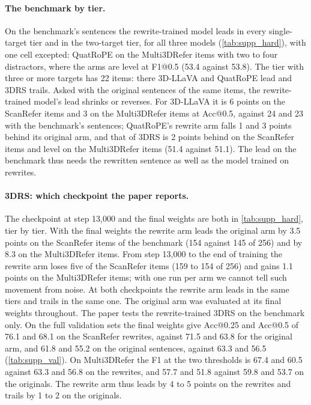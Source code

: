 \paragraph{The benchmark by tier.}
On the benchmark's sentences the rewrite-trained model leads in every single-target tier and in the two-target tier, for all three models (\cref{tab:supp_hard}), with one cell excepted: QuatRoPE on the Multi3DRefer items with two to four distractors, where the arms are level at F1@0.5 (53.4 against 53.8).
The tier with three or more targets has 22 items: there 3D-LLaVA and QuatRoPE lead and 3DRS trails.
Asked with the original sentences of the same items, the rewrite-trained model's lead shrinks or reverses.
For 3D-LLaVA it is 6 points on the ScanRefer items and 3 on the Multi3DRefer items at Acc@0.5, against 24 and 23 with the benchmark's sentences; QuatRoPE's rewrite arm falls 1 and 3 points behind its original arm, and that of 3DRS is 2 points behind on the ScanRefer items and level on the Multi3DRefer items (51.4 against 51.1).
The lead on the benchmark thus needs the rewritten sentence as well as the model trained on rewrites.

\paragraph{3DRS: which checkpoint the paper reports.}
The checkpoint at step 13,000 and the final weights are both in \cref{tab:supp_hard}, tier by tier.
With the final weights the rewrite arm leads the original arm by 3.5 points on the ScanRefer items of the benchmark (154 against 145 of 256) and by 8.3 on the Multi3DRefer items.
From step 13,000 to the end of training the rewrite arm loses five of the ScanRefer items (159 to 154 of 256) and gains 1.1 points on the Multi3DRefer items; with one run per arm we cannot tell such movement from noise.
At both checkpoints the rewrite arm leads in the same tiers and trails in the same one.
The original arm was evaluated at its final weights throughout.
The paper tests the rewrite-trained 3DRS on the benchmark only.
On the full validation sets the final weights give Acc@0.25 and Acc@0.5 of 76.1 and 68.1 on the ScanRefer rewrites, against 71.5 and 63.8 for the original arm, and 61.8 and 55.2 on the original sentences, against 63.3 and 56.5 (\cref{tab:supp_val}).
On Multi3DRefer the F1 at the two thresholds is 67.4 and 60.5 against 63.3 and 56.8 on the rewrites, and 57.7 and 51.8 against 59.8 and 53.7 on the originals.
The rewrite arm thus leads by 4 to 5 points on the rewrites and trails by 1 to 2 on the originals.

